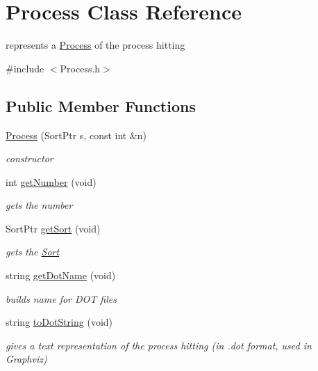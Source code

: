 \hypertarget{class_process}{\section{\-Process \-Class \-Reference}
\label{class_process}
}


represents a \hyperlink{class_process}{\-Process} of the process hitting  




{\ttfamily \#include $<$\-Process.\-h$>$}

\subsection*{\-Public \-Member \-Functions}
\begin{DoxyCompactItemize}
\item 
\hyperlink{class_process_a267617e8f2cfd994e0527635372be90c}{\-Process} (\-Sort\-Ptr s, const int \&n)
\begin{DoxyCompactList}\small\item\em constructor \end{DoxyCompactList}\item 
\hypertarget{class_process_acdfa357f41df6f1e09cdffbc5c5b2c3b}{int \hyperlink{class_process_acdfa357f41df6f1e09cdffbc5c5b2c3b}{get\-Number} (void)}\label{class_process_acdfa357f41df6f1e09cdffbc5c5b2c3b}

\begin{DoxyCompactList}\small\item\em gets the number \end{DoxyCompactList}\item 
\hypertarget{class_process_aaabe803350e1d6dcc23d8aa4ff2314db}{\-Sort\-Ptr \hyperlink{class_process_aaabe803350e1d6dcc23d8aa4ff2314db}{get\-Sort} (void)}\label{class_process_aaabe803350e1d6dcc23d8aa4ff2314db}

\begin{DoxyCompactList}\small\item\em gets the \hyperlink{class_sort}{\-Sort} \end{DoxyCompactList}\item 
string \hyperlink{class_process_af9a89e83db6a14451104b49eac7dd313}{get\-Dot\-Name} (void)
\begin{DoxyCompactList}\small\item\em builds name for \-D\-O\-T files \end{DoxyCompactList}\item 
string \hyperlink{class_process_ad9c1f2be57856c4e62d00f8494d2281f}{to\-Dot\-String} (void)
\begin{DoxyCompactList}\small\item\em gives a text representation of the process hitting (in .dot format, used in \-Graphviz) \end{DoxyCompactList}\end{DoxyCompactItemize}


